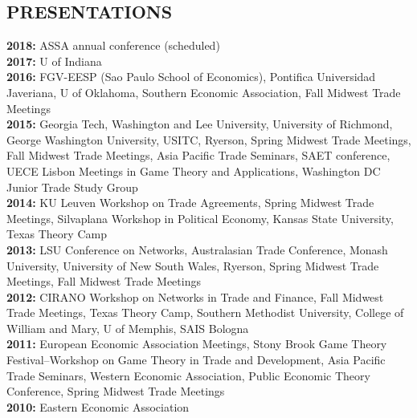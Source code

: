 \documentclass[11pt]{res}
\begin{document}
\begin{resume}
\section{PRESENTATIONS}\vspace{1.5mm}
{\bf 2018:} ASSA annual conference (scheduled)\vspace{1.5mm}\\
{\bf 2017:} U of Indiana \vspace{1.5mm}\\
{\bf 2016:} FGV-EESP (Sao Paulo School of Economics), Pontifica Universidad Javeriana, U of Oklahoma, Southern Economic Association, Fall Midwest Trade Meetings\vspace{1.5mm}\\
{\bf 2015:} Georgia Tech, Washington and Lee University, University of Richmond, George Washington University, USITC, Ryerson, Spring Midwest Trade Meetings, Fall Midwest Trade Meetings, Asia Pacific Trade Seminars, SAET conference, UECE Lisbon Meetings in Game Theory and Applications, Washington DC Junior Trade Study Group\vspace{1.5mm}\\
{\bf 2014:} KU Leuven Workshop on Trade Agreements, Spring Midwest Trade Meetings, Silvaplana Workshop in Political Economy, Kansas State University, Texas Theory Camp\vspace{1.5mm}\\
{\bf 2013:} LSU Conference on Networks, Australasian Trade Conference, Monash University, University of New South Wales, Ryerson, Spring Midwest Trade Meetings, Fall Midwest Trade Meetings \vspace{1.5mm}\\
{\bf 2012:}  CIRANO Workshop on Networks in Trade and Finance, Fall Midwest Trade Meetings, Texas Theory Camp, Southern Methodist University, College of William and Mary, U of Memphis, SAIS Bologna\vspace{1.5mm}\\
{\bf 2011:} European Economic Association Meetings, Stony Brook Game Theory Festival--Workshop on Game Theory in Trade and Development, Asia Pacific Trade Seminars, Western Economic Association, Public Economic Theory Conference, Spring Midwest Trade Meetings\vspace{1.5mm}\\
{\bf 2010:} Eastern Economic Association




\end{resume}
\end{document}
